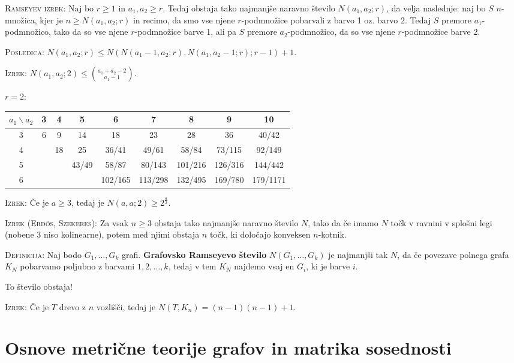 \documentclass[8pt,a4paper]{amsart}
\theoremstyle{definition} %
\theoremstyle{plain} %
\begin{document}
\textsc{Ramseyev izrek:} Naj bo $r \geq 1$ in $a_1, a_2 \geq r$. Tedaj obstaja
tako najmanjše naravno število $N(a_1,a_2;r)$, da velja naslednje: naj bo $S$
$n$-množica, kjer je $n \geq N(a_1,a_2;r)$ in recimo, da smo vse njene
$r$-podmnožice pobarvali z barvo 1 oz. barvo 2. Tedaj $S$ premore
$a_1$-podmnožico, tako da so vse njene $r$-podmnožice barve 1, ali pa $S$
premore $a_2$-podmnožico, da so vse njene $r$-podmnožice barve 2.

\textsc{Posledica:} $N(a_1,a_2;r)\leq N(N(a_1-1,a_2;r),N(a_1,a_2-1;r);r-1)+1$.

\textsc{Izrek:} $N(a_1,a_2;2) \leq \binom{a_1+a_2-2}{a_1-1}$.

$r=2$:
\begin{tabular}{|c||c|c|c|c|c|c|c|c|} \hline
$a_1 \backslash a_2$ & 3 & 4 & 5 & 6 & 7 & 8 & 9 & 10 \\ \hline \hline
3 & 6 & 9 & 14 & 18 & 23 & 28 & 36 & 40/42 \\ \hline
4 &   & 18 & 25 & 36/41 & 49/61 & 58/84 & 73/115 & 92/149 \\ \hline
5 & & & 43/49 & 58/87 & 80/143 & 101/216 & 126/316 & 144/442 \\ \hline
6 & & & & 102/165 & 113/298 & 132/495 & 169/780 & 179/1171 \\ \hline

\end{tabular}

\textsc{Izrek:} Če je $a \geq 3$, tedaj je $N(a,a;2) \geq 2^{\frac{a}{2}}$.

\textsc{Izrek (Erdős, Szekeres):} Za vsak $n \geq 3$ obstaja tako najmanjše
naravno število $N$, tako da če imamo $N$ točk v ravnini v splošni legi (nobene
3 niso kolinearne), potem med njimi obstaja $n$ točk, ki določajo konveksen
$n$-kotnik.

\textsc{Definicija:} Naj bodo $G_1,\ldots ,G_k$ grafi. \textbf{Grafovsko
Ramseyevo število} $N(G_1,\ldots ,G_k)$ je najmanjši tak $N$, da če povezave
polnega grafa $K_N$ pobarvamo poljubno z barvami $1, 2, \ldots ,k$, tedaj v tem
$K_N$ najdemo vsaj en $G_i$, ki je barve $i$.

To število obstaja!

\textsc{Izrek:} Če je $T$ drevo z $n$ vozlišči, tedaj je $N(T,K_n) = (n-1)(n-1)+1$.

\section{Osnove metrične teorije grafov in matrika sosednosti}
\end{document}
